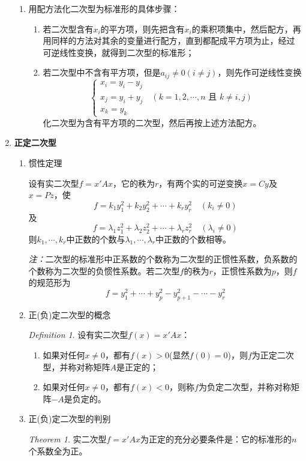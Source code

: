 \documentclass[UTF8]{ctexart}
\theoremstyle{remark}
\newtheorem{theorem}{Theorem}
\newtheorem{definition}{Definition}
\begin{document}
\begin{enumerate}
\begin{enumerate}
		\item 用配方法化二次型为标准形的具体步骤：
		\begin{enumerate}
			\item 若二次型含有$x_i$的平方项，则先把含有$x_i$的乘积项集中，然后配方，再用同样的方法对其余的变量进行配方，直到都配成平方项为止，经过可逆线性变换，就得到二次型的标准形；
			\item 若二次型中不含有平方项，但是$a_{ij}\neq0(i\neq j)$，则先作可逆线性变换
			\[
			\left\{
			\begin{array}{l}
				x_i=y_i-y_j\\
				x_j=y_i+y_j\quad(k=1,2,\cdots,n \text{ 且 } k\neq i,j)\\
				x_k=y_k
			\end{array}
			\right.
			\]
			化二次型为含有平方项的二次型，然后再按上述方法配方。
		\end{enumerate}
	\end{enumerate}
	
	\item \textbf{正定二次型}
	\begin{enumerate}
		\item 惯性定理
		
		设有实二次型$f=x'Ax$，它的秩为$r$，有两个实的可逆变换$x=Cy$及$x=Pz$，使
		\[
		f=k_1y_1^2+k_2y_2^2+\cdots+k_ry_r^2\quad(k_i\neq0)
		\]
		及
		\[
		f=\lambda_1z_1^2+\lambda_2z_2^2+\cdots+\lambda_rz_r^2\quad(\lambda_i\neq0)
		\]
		则$k_1,\cdots,k_r$中正数的个数与$\lambda_1,\cdots,\lambda_r$中正数的个数相等。
		
		\textit{注：}二次型的标准形中正系数的个数称为二次型的正惯性系数，负系数的个数称为二次型的负惯性系数。若二次型$f$的秩为$r$，正惯性系数为$p$，则$f$的规范形为
		\[
		f=y_1^2+\cdots+y_p^2-y_{p+1}^2-\cdots-y_r^2
		\]
		
		\item 正(负)定二次型的概念
		\begin{definition}
			设有实二次型$f(x)=x'Ax$：
			\begin{enumerate}
				\item 如果对任何$x\neq0$，都有$f(x)>0$(显然$f(0)=0$)，则$f$为正定二次型，并称对称矩阵$A$是正定的；
				\item 如果对任何$x\neq0$，都有$f(x)<0$，则称$f$为负定二次型，并称对称矩阵$-A$是负定的。
			\end{enumerate}
		\end{definition}
		
		\item 正(负)定二次型的判别
		\begin{theorem}
			实二次型$f=x'Ax$为正定的充分必要条件是：它的标准形的$n$个系数全为正。
		\end{theorem}
		

\end{enumerate}
\end{enumerate}
\end{document}
